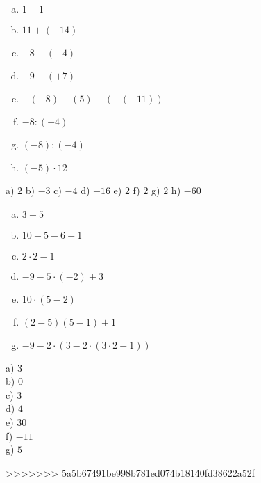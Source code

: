     
    \begin{multicols}{2}
        \begin{tehtava}
            \begin{enumerate}[(a)]
                \item $1+1$
                \item $11+(-14)$
                \item $-8-(-4)$
                \item $-9-(+7)$
                \item $-(-8)+(5)-(-(-11))$
                \item $-8:(-4)$
                \item $(-8):(-4)$
                \item $(-5)\cdot 12$
            \end{enumerate}
            
            \begin{vastaus}
                a) $2$
                b) $-3$
                c) $-4$
                d) $-16$
                e) $2$
                f) $2$
                g) $2$
                h) $-60$
            \end{vastaus}
        \end{tehtava}
        
        \begin{tehtava}
            \begin{enumerate}[(a)]
                \item $3+5$
                \item $10-5-6+1$
                \item $2 \cdot 2 - 1$
                \item $-9 - 5 \cdot (-2) + 3$ 
                \item $10 \cdot (5 - 2)$
                \item $(2-5)(5 - 1) + 1$
                \item $-9 - 2 \cdot ( 3 - 2 \cdot (3\cdot2 - 1))$
            \end{enumerate}
            
            \begin{vastaus} 
                a) $3$ \\
                b) $0$ \\
                c) $3$ \\
                d) $4$ \\
                e) $30$ \\
                f) $-11$ \\
                g) $5$ \\
            \end{vastaus}
        \end{tehtava}
    \end{multicols}
>>>>>>> 5a5b67491be998b781ed074b18140fd38622a52f
